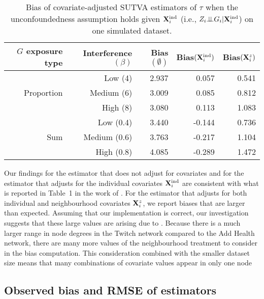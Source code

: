 \documentclass[10pt]{article}
\begin{document}
\begin{table}[ht]
\centering
\begin{tabular}{@{}rrrrr@{}}
\toprule
$G$ exposure type & Interference $(\beta)$ & Bias$(\emptyset)$ & Bias$(\mathbf{X}^{\text{ind}}_i)$ & Bias$(\mathbf{X}_i^z)$ \\
\midrule
\multirow{3}{*}{Proportion} & Low (4) & 2.937 & 0.057 & 0.541 \\
& Medium (6) & 3.009 & 0.085 & 0.812 \\
& High (8) & 3.080 & 0.113 & 1.083 \\[1em]
\multirow{3}{*}{Sum} & Low (0.4) & 3.440 & -0.144 & 0.736 \\
& Medium (0.6) & 3.763 & -0.217 & 1.104 \\
& High (0.8) & 4.085 & -0.289 & 1.472 \\
\bottomrule
\end{tabular}
\caption{Bias of covariate-adjusted SUTVA estimators of $\tau$ when the unconfoundedness assumption holds given $\mathbf{X}^{\text{ind}}_i$ (i.e., $Z_i{\perp\!\!\!\perp} G_i|\mathbf{X}^{\text{ind}}_i$) on one simulated dataset.}
\label{tab:table1}
\end{table}

Our findings for the estimator that does not adjust for covariates and for the estimator that adjusts for the individual covariates $\mathbf{X}^{\text{ind}}_i$ are consistent with what is reported in Table~1 in the work of \textcite{Forastiere:2021}. For the estimator that adjusts for both individual and neighbourhood covariates $\mathbf{X}^z_i$, we report biases that are larger than expected. Assuming that our implementation is correct, our investigation suggests that these large values are arising due to \todo. Because there is a much larger range in node degrees in the Twitch network compared to the Add Health network, there are many more values of the neighbourhood treatment to consider in the bias computation. This consideration combined with the smaller dataset size means that many combinations of covariate values appear in only one node \todo

\subsection{Observed bias and RMSE of estimators}\label{sec:observedbias}
\end{document}
